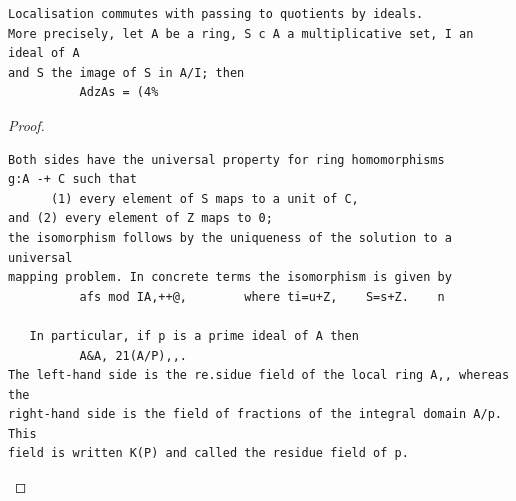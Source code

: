 \begin{theorem}\label{mcrt-auto-theorem-4-2}\uses{}
\begin{verbatim}
Localisation commutes with passing to quotients by ideals.
More precisely, let A be a ring, S c A a multiplicative set, I an ideal of A
and S the image of S in A/I; then
          AdzAs = (4%
\end{verbatim}
\end{theorem}
\begin{proof}
\begin{verbatim}
Both sides have the universal property for ring homomorphisms
g:A -+ C such that
      (1) every element of S maps to a unit of C,
and (2) every element of Z maps to 0;
the isomorphism follows by the uniqueness of the solution to a universal
mapping problem. In concrete terms the isomorphism is given by
          afs mod IA,++@,        where ti=u+Z,    S=s+Z.    n

   In particular, if p is a prime ideal of A then
          A&A, 21(A/P),,.
The left-hand side is the re.sidue field of the local ring A,, whereas the
right-hand side is the field of fractions of the integral domain A/p. This
field is written K(P) and called the residue field of p.
\end{verbatim}
\end{proof}


